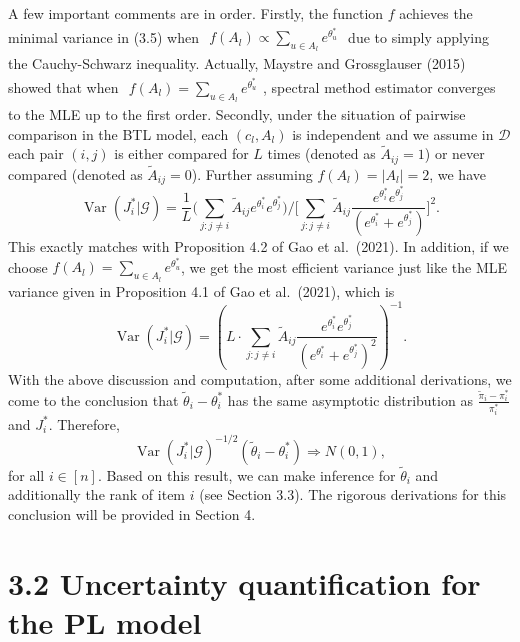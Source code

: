 A few important comments are in order. Firstly, the function \(f\) achieves the minimal variance in (3.5) when \(\begin{array}{r}{f(A_{l})\propto \sum_{u\in A_{l}}e^{\theta_{u}^{*}}} \end{array}\) due to simply applying the Cauchy-Schwarz inequality. Actually, Maystre and Grossglauser (2015) showed that when \(\begin{array}{r}f(A_l) = \sum_{u\in A_l}e^{\theta_u^*} \end{array}\), spectral method estimator converges to the MLE up to the first order. Secondly, under the situation of pairwise comparison in the BTL model, each \((c_l,A_l)\) is independent and we assume in \(\mathcal{D}\) each pair \((i,j)\) is either compared for \(L\) times (denoted as \(\widetilde{A}_{ij} = 1\)) or never compared (denoted as \(\widetilde{A}_{ij} = 0\)). Further assuming \(f(A_{l}) = |A_{l}| = 2\), we have
\[
\operatorname {Var}(J_i^* |\mathcal{G}) = \frac{1}{L}\bigg(\sum_{j:j\neq i}\widetilde{A}_{ij}e^{\theta_i^*}e^{\theta_j^*}\bigg)\bigg / \bigg[\sum_{j:j\neq i}\widetilde{A}_{ij}\frac{e^{\theta_i^*}e^{\theta_j^*}}{(e^{\theta_i^*} + e^{\theta_j^*})}\bigg]^2.
\]
This exactly matches with Proposition 4.2 of Gao et al.~(2021). In addition, if we choose \(f(A_{l}) = \sum_{u\in A_l}e^{\theta_u^*}\), we get the most efficient variance just like the MLE variance given in Proposition 4.1 of Gao et al.~(2021), which is
\[
\operatorname {Var}(J_i^* |\mathcal{G}) = \left(L\cdot \sum_{j:j\neq i}\widetilde{A}_{ij}\frac{e^{\theta_i^*}e^{\theta_j^*}}{(e^{\theta_i^*} + e^{\theta_j^*})^2}\right)^{-1}.
\]
With the above discussion and computation, after some additional derivations, we come to the conclusion that \(\widetilde{\theta}_{i} - \theta_{i}^{*}\) has the same asymptotic distribution as \(\frac{\widetilde{\pi}_{i} - \pi_{i}^{*}}{\pi_{i}^{*}}\) and \(J_{i}^{*}\). Therefore,
\[
\operatorname {Var}(J_i^* |\mathcal{G})^{-1 / 2}(\widetilde{\theta}_i - \theta_i^*)\Rightarrow N(0,1),
\]
for all \(i\in [n]\). Based on this result, we can make inference for \(\widetilde{\theta}_{i}\) and additionally the rank of item \(i\) (see Section 3.3). The rigorous derivations for this conclusion will be provided in Section 4.

\section{3.2 Uncertainty quantification for the PL model}\label{uncertainty-quantification-for-the-pl-model}

